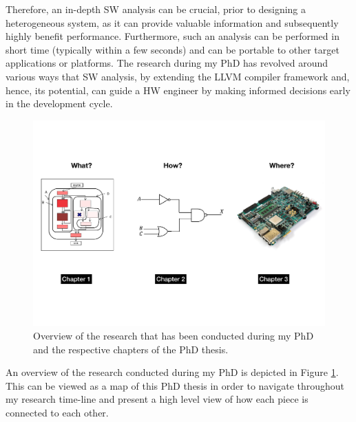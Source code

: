 \documentclass[]{usiinfthesis}
\begin{document}
Therefore, an in-depth SW analysis can be crucial, prior to 
designing a heterogeneous system, as it can provide valuable information and subsequently 
highly benefit performance. Furthermore, such an analysis can be performed in short time (typically within a 
few seconds) and can be portable to other target applications or platforms. 
The research during my PhD has revolved around various ways that SW
analysis, by extending the LLVM compiler framework \cite{LattnerMar04} and, hence, its potential,
can guide a HW engineer %
by making informed decisions early in the development cycle.

\begin{figure}[t]
\centering
\includegraphics[width= 1 \linewidth]{figs/Research_Carol}
\caption{Overview of the research that has been conducted during my PhD and the respective chapters
of the PhD thesis.}
\label{fig:overview}
\end{figure}

An overview of the research conducted during my PhD is depicted in Figure \ref{fig:overview}.
This can be viewed as a map of this PhD thesis in order to navigate throughout my 
research time-line and present a high level view of how each piece is connected to each other.\par
\end{document}
